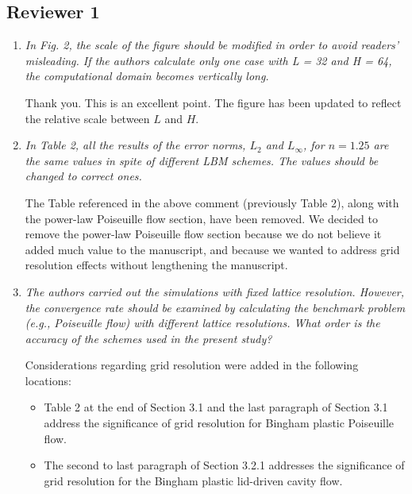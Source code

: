 \documentclass{article}
\begin{document}
  \subsection*{Reviewer 1}
	\begin{enumerate}
		\item \emph{In Fig. 2, the scale of the figure should be modified in order to avoid readers’ misleading. If the authors calculate only one case with L = 32 and H = 64, the computational domain becomes vertically long.}
		
		Thank you. This is an excellent point. The figure has been updated to reflect the relative scale between $L$ and $H$.
		
		\item \emph{In Table 2, all the results of the error norms, $L_{2}$ and $L_{\infty}$, for $n = 1.25$ are the same values in spite of different LBM schemes. The values should be changed to correct ones.}
		
		
		The Table referenced in the above comment (previously Table 2), along with the power-law Poiseuille flow section, have been removed. We decided to remove the power-law Poiseuille flow section because we do not believe it added much value to the manuscript, and because we wanted to address grid resolution effects without lengthening the manuscript.
		
		\item \emph{The authors carried out the simulations with fixed lattice resolution. However, the convergence rate should be examined by calculating the benchmark problem (e.g., Poiseuille flow) with different lattice resolutions. 
		What order is the accuracy of the schemes used in the present study?}
	
		Considerations regarding grid resolution were added in the following locations:
		\begin{itemize}
			\item Table 2 at the end of Section 3.1 and the last paragraph of Section 3.1 address the significance of grid resolution for Bingham plastic Poiseuille flow.
			\item The second to last paragraph of Section 3.2.1 addresses the significance of grid resolution for the Bingham plastic lid-driven cavity flow.
		\end{itemize}
	

\end{enumerate}
\end{document}
